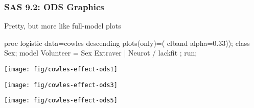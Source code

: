 \begin{frame}[fragile]
\frametitle{SAS 9.2: ODS Graphics}
Pretty, but more like full-model plots
\vspace{1.2ex}
\begin{Input}[fontsize=\footnotesize,label=\fbox{\texttt{cowles-effect-ods.sas}},baselinestretch=0.8]
proc logistic data=cowles descending
         plots(only)=(
		              clband alpha=0.33));
  class Sex;
  model Volunteer = Sex   Extraver | Neurot / lackfit ;
  run;
\end{Input}
 \begin{minipage}[b]{.33\linewidth}
  \centering
  \texttt{[image: fig/cowles-effect-ods1]}
 \end{minipage}%
 \hfill
 \begin{minipage}[b]{.33\linewidth}
  \centering
  \texttt{[image: fig/cowles-effect-ods3]}
 \end{minipage}
 \hfill
 \begin{minipage}[b]{.33\linewidth}
  \centering
  \texttt{[image: fig/cowles-effect-ods5]}
 \end{minipage}

\end{frame}
